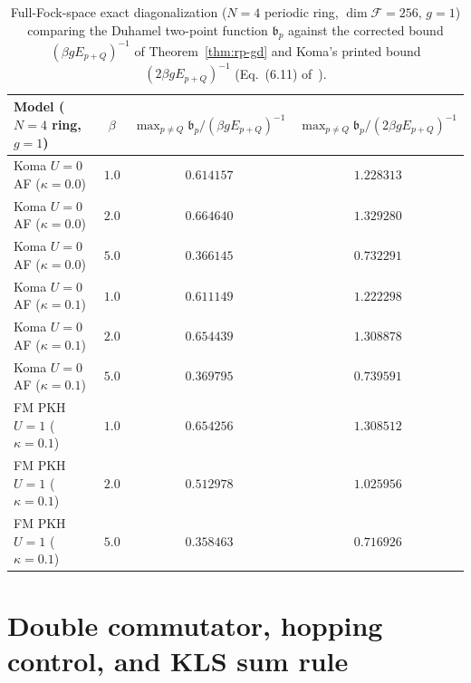\documentclass[11pt]{article}
\theoremstyle{definition}
\theoremstyle{remark}
\newcommand{\calF}{\mathcal{F}}
\begin{document}
\begin{table}[ht]
\centering
\caption{Full-Fock-space exact diagonalization ($N=4$ periodic ring, $\dim \calF = 256$, $g = 1$) comparing the Duhamel two-point function $\mathfrak{b}_p$ against the corrected bound $(\beta g E_{p+Q})^{-1}$ of Theorem~\ref{thm:rp-gd} and Koma's printed bound $(2\beta g E_{p+Q})^{-1}$ (Eq.~(6.11) of~\cite{koma2022}).}\label{tab:koma-counter}
\begin{tabular}{@{}l c c c@{}}
\toprule
Model ($N=4$ ring, $g=1$) & $\beta$ & $\max_{p\ne Q} \mathfrak{b}_p / (\beta g E_{p+Q})^{-1}$ & $\max_{p\ne Q} \mathfrak{b}_p / (2\beta g E_{p+Q})^{-1}$ \\
\midrule
Koma $U = 0$ AF ($\kappa = 0.0$) & $1.0$ & $0.614157$ & $1.228313$ \\
Koma $U = 0$ AF ($\kappa = 0.0$) & $2.0$ & $0.664640$ & $1.329280$ \\
Koma $U = 0$ AF ($\kappa = 0.0$) & $5.0$ & $0.366145$ & $0.732291$ \\
Koma $U = 0$ AF ($\kappa = 0.1$) & $1.0$ & $0.611149$ & $1.222298$ \\
Koma $U = 0$ AF ($\kappa = 0.1$) & $2.0$ & $0.654439$ & $1.308878$ \\
Koma $U = 0$ AF ($\kappa = 0.1$) & $5.0$ & $0.369795$ & $0.739591$ \\
FM PKH $U = 1$ ($\kappa = 0.1$)  & $1.0$ & $0.654256$ & $1.308512$ \\
FM PKH $U = 1$ ($\kappa = 0.1$)  & $2.0$ & $0.512978$ & $1.025956$ \\
FM PKH $U = 1$ ($\kappa = 0.1$)  & $5.0$ & $0.358463$ & $0.716926$ \\
\bottomrule
\end{tabular}
\end{table}

\section{Double commutator, hopping control, and KLS sum rule}\label{sec:sumrule}
\end{document}
